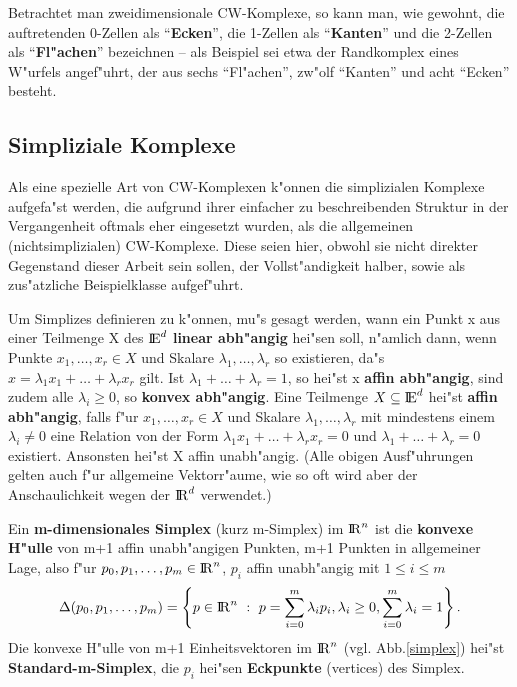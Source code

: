 Betrachtet man zweidimensionale CW-Komplexe, so kann man, wie gewohnt, die
auftretenden 0-Zellen als "`{\bf Ecken}"', die 1-Zellen als "`{\bf Kanten}"'
und die 2-Zellen als "`{\bf Fl"achen}"' bezeichnen -- als Beispiel sei etwa
der Randkomplex eines W"urfels angef"uhrt, der aus sechs "`Fl"achen"', zw"olf
"`Kanten"' und acht "`Ecken"' besteht.

\subsection{Simpliziale Komplexe}

Als eine spezielle Art von CW-Komplexen k"onnen die simplizialen Komplexe
aufgefa"st werden, die aufgrund ihrer einfacher zu beschreibenden Struktur
in der Vergangenheit oftmals eher eingesetzt wurden, als die
allgemeinen (nichtsimplizialen) CW-Komplexe. Diese seien hier, obwohl sie nicht
direkter Gegenstand dieser Arbeit sein sollen, der Vollst"andigkeit halber,
sowie als zus"atzliche Beispielklasse aufgef"uhrt.

Um Simplizes definieren zu k"onnen, mu"s gesagt werden, wann ein Punkt
x aus einer Teilmenge X des $\mbox{$\rm I\!E$}^d$ {\bf linear abh"angig} hei"sen soll, n"amlich
dann, wenn Punkte $x_1,\ldots,x_r\in X$ und Skalare $\lambda_1,\ldots,\lambda_r$
so existieren, da"s $x=\lambda_1x_1+\ldots+\lambda_rx_r$ gilt. Ist
$\lambda_1+\ldots+\lambda_r=1$, so hei"st x {\bf affin abh"angig}, sind zudem
alle $\lambda_i\geq 0$, so {\bf konvex abh"angig}. Eine Teilmenge
$X\subseteq\mbox{$\rm I\!E$}^d$ hei"st {\bf affin abh"angig}, falls f"ur $x_1,\ldots,x_r\in X$
und Skalare $\lambda_1,\ldots,\lambda_r$ mit mindestens einem $\lambda_i\neq 0$
eine Relation von der Form $\lambda_1x_1+\ldots+\lambda_rx_r=0$ und
$\lambda_1+\ldots+\lambda_r=0$ existiert. Ansonsten hei"st X affin unabh"angig.
(Alle obigen Ausf"uhrungen gelten auch f"ur allgemeine Vektorr"aume, wie
so oft wird aber der Anschaulichkeit wegen der $\mbox{$\rm I\!R$}^d$ verwendet.)

Ein {\bf m-dimensionales Simplex} (kurz m-Sim\-plex)
im $\mbox{$\rm I\!R$}^n$ ist die {\bf konvexe H"ulle} von m+1 affin unabh"angigen Punkten, m+1
Punkten in allgemeiner Lage, also f"ur $p_0,p_1,\ldots,p_m\in\mbox{$\rm I\!R$}^n$, $p_i$
affin unabh"angig mit $1\leq i\leq m$
$$
   \Delta(p_0,p_1,\ldots,p_m) =
   \left\{ p\in\mbox{$\rm I\!R$}^n~:~p = \sum\limits_{i=0}^m \lambda_i p_i, \lambda_i\geq 0,
   \sum\limits_{i=0}^m \lambda_i = 1\right\}.
$$
Die konvexe H"ulle von m+1 Einheitsvektoren im $\mbox{$\rm I\!R$}^n$ (vgl. Abb.\ref{simplex})
hei"st {\bf Standard-m-Simplex}, die $p_i$ hei"sen
{\bf Eckpunkte} (vertices) des Simplex.

